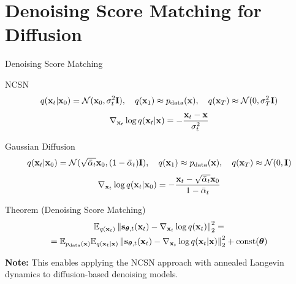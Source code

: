 \documentclass{beamer}
\renewcommand{\eqpause}{}
\begin{document}
\section{Denoising Score Matching for Diffusion}
\begin{frame}{Denoising Score Matching}
	\begin{block}{NCSN} 
		\vspace{-0.7cm} 
		\[
			q(\mathbf{x}_t | \mathbf{x}_0) = \mathcal{N}(\mathbf{x}_0, \sigma_t^2 \mathbf{I}), \quad q(\mathbf{x}_1) \approx p_{\text{data}}(\mathbf{x}), \quad q(\mathbf{x}_T) \approx \mathcal{N}(0, \sigma_T^2 \mathbf{I})
		\]
		\[
			\nabla_{\mathbf{x}_t} \log q(\mathbf{x}_t | \mathbf{x}) = - \frac{\mathbf{x}_t - \mathbf{x}}{\sigma_t^2}
		\]
		\vspace{-0.6cm} 
	\end{block}
    \eqpause
	\begin{block}{Gaussian Diffusion}
		\vspace{-0.7cm} 
		\[
			q(\mathbf{x}_t | \mathbf{x}_0) = \mathcal{N}(\sqrt{\bar{\alpha}_t} \mathbf{x}_0, (1 - \bar{\alpha}_t) \mathbf{I}), \quad q(\mathbf{x}_1) \approx p_{\text{data}}(\mathbf{x}), \quad q(\mathbf{x}_T) \approx \mathcal{N}(0, \mathbf{I})
		\]
		\[
			\nabla_{\mathbf{x}_t} \log q(\mathbf{x}_t | \mathbf{x}_0) = - \frac{\mathbf{x}_t - \sqrt{\bar{\alpha}_t} \mathbf{x}_0}{1 - \bar{\alpha}_t}
		\]
		\vspace{-0.6cm} 
	\end{block}
    \eqpause
	\begin{block}{Theorem (Denoising Score Matching)}
		\vspace{-0.7cm}
		\begin{multline*}
			\mathbb{E}_{q(\mathbf{x}_t)}\left\| \mathbf{s}_{\boldsymbol{\theta}, t}(\mathbf{x}_t) - \nabla_{\mathbf{x}_t} \log q(\mathbf{x}_t) \right\|_2^2 = \\
			= \mathbb{E}_{p_{\text{data}}(\mathbf{x})} \mathbb{E}_{q(\mathbf{x}_t | \mathbf{x})}\left\| \mathbf{s}_{\boldsymbol{\theta}, t}(\mathbf{x}_t) - \nabla_{\mathbf{x}_t} \log q(\mathbf{x}_t | \mathbf{x}) \right\|_2^2 + \text{const}(\boldsymbol{\theta})
		\end{multline*}
		\vspace{-0.5cm}
	\end{block}
    \eqpause
	\textbf{Note:} This enables applying the NCSN approach with annealed Langevin dynamics to diffusion-based denoising models.
\end{frame}
\end{document}
